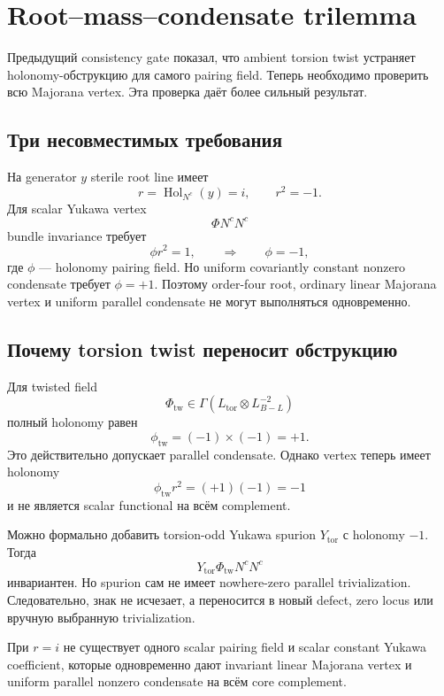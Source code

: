 \chapter{Root--mass--condensate trilemma}

Предыдущий consistency gate показал, что ambient torsion twist устраняет
holonomy-обструкцию для самого pairing field. Теперь необходимо проверить
всю Majorana vertex. Эта проверка даёт более сильный результат.

\section{Три несовместимых требования}

На generator \(y\) sterile root line имеет
\[
 r=\operatorname{Hol}_{N^c}(y)=i,
 \qquad r^2=-1.
\]
Для scalar Yukawa vertex
\[
 \Phi N^cN^c
\]
bundle invariance требует
\begin{equation}
 \phi r^2=1,
 \qquad\Longrightarrow\qquad
 \phi=-1,
\end{equation}
где \(\phi\) --- holonomy pairing field. Но uniform covariantly constant
nonzero condensate требует \(\phi=+1\). Поэтому order-four root, ordinary
linear Majorana vertex и uniform parallel condensate не могут выполняться
одновременно.

\section{Почему torsion twist переносит обструкцию}

Для twisted field
\[
 \Phi_{\mathrm{tw}}\in
 \Gamma(L_{\mathrm{tor}}\otimes L_{B-L}^{-2})
\]
полный holonomy равен
\[
 \phi_{\mathrm{tw}}=(-1)\times(-1)=+1.
\]
Это действительно допускает parallel condensate. Однако vertex теперь
имеет holonomy
\[
 \phi_{\mathrm{tw}}r^2=(+1)(-1)=-1
\]
и не является scalar functional на всём complement.

Можно формально добавить torsion-odd Yukawa spurion \(Y_{\mathrm{tor}}\)
с holonomy \(-1\). Тогда
\[
 Y_{\mathrm{tor}}\Phi_{\mathrm{tw}}N^cN^c
\]
инвариантен. Но spurion сам не имеет nowhere-zero parallel trivialization.
Следовательно, знак не исчезает, а переносится в новый defect, zero locus
или вручную выбранную trivialization.

\begin{nogocriterion}
При \(r=i\) не существует одного scalar pairing field и scalar constant
Yukawa coefficient, которые одновременно дают invariant linear Majorana
vertex и uniform parallel nonzero condensate на всём core complement.
\end{nogocriterion}

